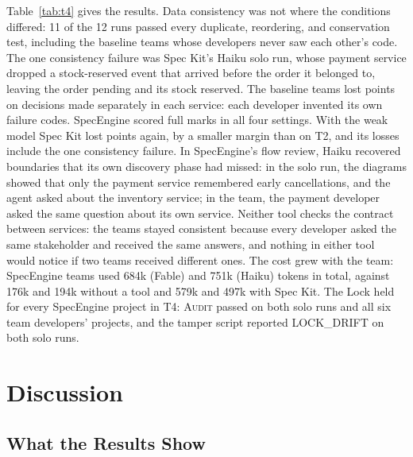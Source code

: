 \documentclass[conference]{IEEEtran}
\begin{document}
Table~\ref{tab:t4} gives the results. Data consistency was not where the conditions differed: 11 of the 12 runs passed every duplicate, reordering, and conservation test, including the baseline teams whose developers never saw each other's code. The one consistency failure was Spec Kit's Haiku solo run, whose payment service dropped a stock-reserved event that arrived before the order it belonged to, leaving the order pending and its stock reserved. The baseline teams lost points on decisions made separately in each service: each developer invented its own failure codes. SpecEngine scored full marks in all four settings. With the weak model Spec Kit lost points again, by a smaller margin than on T2, and its losses include the one consistency failure. In SpecEngine's flow review, Haiku recovered boundaries that its own discovery phase had missed: in the solo run, the diagrams showed that only the payment service remembered early cancellations, and the agent asked about the inventory service; in the team, the payment developer asked the same question about its own service. Neither tool checks the contract between services: the teams stayed consistent because every developer asked the same stakeholder and received the same answers, and nothing in either tool would notice if two teams received different ones. The cost grew with the team: SpecEngine teams used 684k (Fable) and 751k (Haiku) tokens in total, against 176k and 194k without a tool and 579k and 497k with Spec Kit. The Lock held for every SpecEngine project in T4: \textsc{Audit} passed on both solo runs and all six team developers' projects, and the tamper script reported LOCK\_DRIFT on both solo runs.

\section{Discussion}\label{sec:discussion}

\subsection{What the Results Show}
\end{document}
